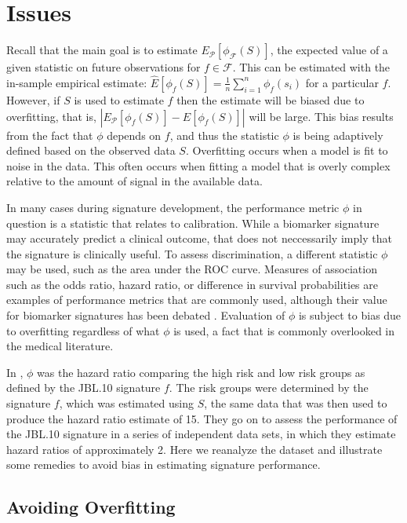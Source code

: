 \documentclass[12pt,]{article}
\begin{document}
\section{Issues}\label{issues}

Recall that the main goal is to estimate
\(E_\mathcal{P}[\phi_\mathcal{F}(S)]\), the expected value of a given
statistic on future observations for \(f \in \mathcal{F}\). This can be
estimated with the in-sample empirical estimate:
\(\hat{E}[\phi_f(S)] = \frac{1}{n}\sum_{i=1}^n\phi_f(s_i)\) for a
particular \(f\). However, if \(S\) is used to estimate \(f\) then the
estimate will be biased due to overfitting, that is,
\(|E_\mathcal{P}[\phi_f(S)] - \hat{E}[\phi_f(S)]|\) will be large. This
bias results from the fact that \(\phi\) depends on \(f\), and thus the
statistic \(\phi\) is being adaptively defined based on the observed
data \(S\). Overfitting occurs when a model is fit to noise in the data.
This often occurs when fitting a model that is overly complex relative
to the amount of signal in the available data.

In many cases during signature development, the performance metric
\(\phi\) in question is a statistic that relates to calibration. While a
biomarker signature may accurately predict a clinical outcome, that does
not neccessarily imply that the signature is clinically useful. To
assess discrimination, a different statistic \(\phi\) may be used, such
as the area under the ROC curve. Measures of association such as the
odds ratio, hazard ratio, or difference in survival probabilities are
examples of performance metrics that are commonly used, although their
value for biomarker signatures has been debated
\citep{pepe2004limitations}. Evaluation of \(\phi\) is subject to bias
due to overfitting regardless of what \(\phi\) is used, a fact that is
commonly overlooked in the medical literature.

In \citet{zhu2010prognostic}, \(\phi\) was the hazard ratio comparing
the high risk and low risk groups as defined by the JBL.10 signature
\(f\). The risk groups were determined by the signature \(f\), which was
estimated using \(S\), the same data that was then used to produce the
hazard ratio estimate of 15. They go on to assess the performance of the
JBL.10 signature in a series of independent data sets, in which they
estimate hazard ratios of approximately 2. Here we reanalyze the dataset
and illustrate some remedies to avoid bias in estimating signature
performance.

\subsection{Avoiding Overfitting}\label{avoiding-overfitting}
\end{document}

